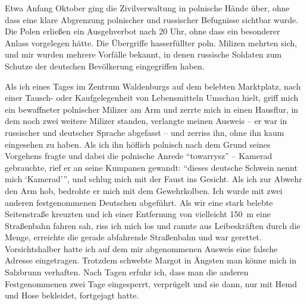 \documentclass[a5paper,pagesize,10pt,twoside=true]{scrbook}
\renewcommand{\marginpar}[2][]{}
\begin{document}
\marginpar{114} Etwa Anfang Oktober ging die Zivilverwaltung in polnische Hände über, ohne dass eine klare Abgrenzung polnischer und russischer Befugnisse sichtbar wurde. Die Polen erließen ein Ausgehverbot nach 20 Uhr, ohne dass ein besonderer Anlass vorgelegen hätte. Die Übergriffe hasserfüllter poln. Milizen mehrten sich, und mir wurden mehrere Vorfälle bekannt, in denen russische Soldaten zum Schutze der deutschen Bevölkerung eingegriffen haben.

Als ich eines Tages im Zentrum Waldenburgs auf dem belebten Marktplatz, nach einer Tausch- oder Kaufgelegenheit von Lebensmitteln Umschau hielt, griff mich ein bewaffneter polnischer Milizer am Arm und zerrte mich in einen Hausflur, in dem noch zwei weitere Milizer standen, verlangte meinen Ausweis -- er war in russischer und deutscher Sprache abgefasst -- und zerriss ihn, ohne ihn kaum eingesehen zu haben. Als ich ihn höflich polnisch nach dem Grund seines Vorgehens fragte und dabei die polnische Anrede \enquote{towarrysz} -- Kamerad gebrauchte, rief er an seine Kumpanen gewandt: \enquote{dieses deutsche Schwein nennt mich \enquote{Kamerad}}, und schlug mich mit der Faust ins Gesicht. Als ich zur Abwehr den Arm hob, bedrohte er mich mit dem Gewehrkolben. Ich wurde mit zwei anderen festgenommenen Deutschen abgeführt. Als wir eine stark belebte Seitenstraße kreuzten und ich einer Entfernung von vielleicht 150~m eine Straßenbahn fahren \marginpar{115} sah, riss ich mich los und rannte aus Leibeskräften durch die Menge, erreichte die gerade abfahrende Straßenbahn und war gerettet. Vorsichtshalber hatte ich auf dem mir abgenommenen Ausweis eine falsche Adresse eingetragen. Trotzdem schwebte Margot in Ängsten man könne mich in Salzbrunn verhaften. Nach Tagen erfuhr ich, dass man die anderen Festgenommenen zwei Tage eingesperrt, verprügelt und sie dann, nur mit Hemd und Hose bekleidet, fortgejagt hatte.
\end{document}
